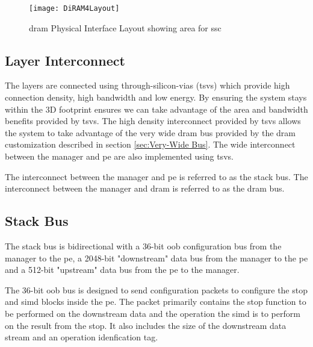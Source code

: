\begin{figure}[!t]
\centering
\captionsetup{justification=centering}
\captionsetup{width=.9\linewidth}
\centerline{
\mbox{\texttt{[image: DiRAM4Layout]}}
}
\caption{\ac{dram} Physical Interface Layout showing area for \ac{ssc}}
\label{fig:diram4Layout}
\end{figure}


\subsection{Layer Interconnect}
\label{sec:Layer Interconnect}

The layers are connected using through-silicon-vias (\ac{tsv}s) which provide high connection density, high bandwidth and low energy.
By ensuring the system stays within the 3D footprint ensures we can take advantage of the area and bandwidth benefits provided by \acp{tsv}.
The high density interconnect provided by \acp{tsv} allows the system to take advantage of the very wide \ac{dram} bus provided by the \ac{dram} customization described in section \ref{sec:Very-Wide Bus}.
The wide interconnect between the manager and \ac{pe} are also implemented using \acp{tsv}.

The interconnect between the manager and \ac{pe} is referred to as the stack bus. The interconnect between the manager and \ac{dram} is referred to as the \ac{dram} bus.

\subsection{Stack Bus}
\label{sec:Stack Bus}

The stack bus is bidirectional with a 36-bit \ac{oob} configuration bus from the manager to the \ac{pe}, a 2048-bit "downstream" data bus from the manager to the \ac{pe} and a 512-bit "upstream" data bus from the \ac{pe} to the manager.

The 36-bit \ac{oob} bus is designed to send configuration packets to configure the \ac{stop} and \ac{simd} blocks inside the \ac{pe}.
The packet primarily contains the \ac{stop} function to be performed on the downstream data and the operation the \ac{simd} is to perform on the result from the \ac{stop}.
It also includes the size of the downstream data stream and an operation idenfication tag.


